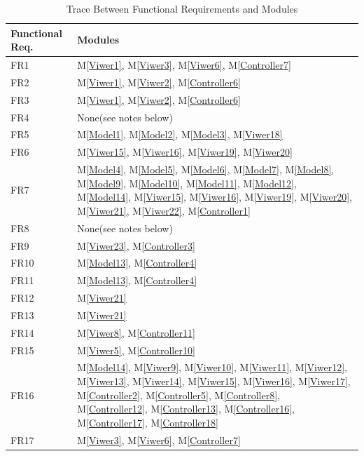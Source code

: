 \documentclass[12pt, titlepage]{article}
\newcommand{\mref}[1]{M\ref{#1}}
\begin{document}
\begin{table}[H]
\caption{Trace Between Functional Requirements and Modules}
\label{TbFRM}

\centering
\begin{tabular}{p{} p{}}
\toprule
\textbf{Functional Req.} & \textbf{Modules}\\
\midrule
FR1 & \mref{Viwer1}, \mref{Viwer3}, \mref{Viwer6}, \mref{Controller7}\\
FR2 & \mref{Viwer1}, \mref{Viwer2}, \mref{Controller6}\\
FR3 & \mref{Viwer1}, \mref{Viwer2}, \mref{Controller6}\\
FR4 & None(see notes below)\\
FR5 & \mref{Model1}, \mref{Model2}, \mref{Model3}, \mref{Viwer18}\\
FR6 & \mref{Viwer15}, \mref{Viwer16}, \mref{Viwer19}, \mref{Viwer20}\\
FR7 & \mref{Model4}, \mref{Model5}, \mref{Model6}, \mref{Model7}, \mref{Model8}, 
\mref{Model9}, \mref{Model10}, \mref{Model11}, \mref{Model12}, \mref{Model14}, 
\mref{Viwer15}, \mref{Viwer16}, \mref{Viwer19}, \mref{Viwer20}, \mref{Viwer21}, 
\mref{Viwer22}, \mref{Controller1}\\
FR8 & None(see notes below)\\
FR9 & \mref{Viwer23}, \mref{Controller3}\\
FR10 & \mref{Model13}, \mref{Controller4}\\
FR11 & \mref{Model13}, \mref{Controller4}\\
FR12 & \mref{Viwer21}\\
FR13 & \mref{Viwer21}\\
FR14 & \mref{Viwer8}, \mref{Controller11}\\
FR15 & \mref{Viwer5}, \mref{Controller10}\\
FR16 & \mref{Model14}, \mref{Viwer9}, \mref{Viwer10}, \mref{Viwer11}, \mref{Viwer12}, 
\mref{Viwer13}, \mref{Viwer14}, \mref{Viwer15}, \mref{Viwer16}, \mref{Viwer17}, 
\mref{Controller2}, \mref{Controller5}, \mref{Controller8}, \mref{Controller12},
\mref{Controller13}, \mref{Controller16}, \mref{Controller17}, \mref{Controller18}\\
FR17 & \mref{Viwer3}, \mref{Viwer6}, \mref{Controller7}\\
\bottomrule
\end{tabular}
\end{table}
\end{document}
